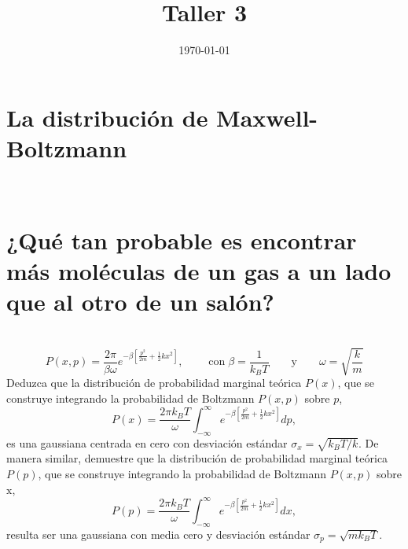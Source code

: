 \documentclass[a4paper]{article}
\date{\today}
\title{Taller 3}
\begin{document}
    \header{}

    \section{La distribución de Maxwell-Boltzmann}
    \\
    
    
    
    
    
    
    
    
    
    
    \section{ ¿Qué tan probable es encontrar más moléculas de un gas a 
    un lado que al otro de un salón?}
    
    
    
    
    
    
    
    
    
    \\
    
    
    
    
    
    
    
    
    
    
    
    
    



    
    $$
    P(x, p)=\frac{2 \pi}{\beta \omega} e^{-\beta\left[\frac{p^2}{2 m}+\frac{1}{2} k x^2\right]},\qquad  \operatorname{con} \beta=\frac{1}{k_B T} \qquad \mathrm{y} \qquad \omega=\sqrt{\frac{k}{m}}
    $$
    Deduzca que la distribución de probabilidad marginal teórica $P(x)$, que se construye integrando la probabilidad de Boltzmann $P(x, p)$ sobre $p$,
    $$
    P(x)=\frac{2 \pi k_B T}{\omega} \int_{-\infty}^{\infty} e^{-\beta\left[\frac{p^2}{2 m}+\frac{1}{2} k x^2\right]} d p,
    $$
    es una gaussiana centrada en cero con desviación estándar $\sigma_x=\sqrt{k_B T / k}$. De manera similar, demuestre que la distribución de probabilidad marginal teórica $P(p)$, que se construye integrando la probabilidad de Boltzmann $P(x, p)$ sobre $\mathrm{x}$,
    $$
    P(p)=\frac{2 \pi k_B T}{\omega} \int_{-\infty}^{\infty} e^{-\beta\left[\frac{p^2}{2 m}+\frac{1}{2} k x^2\right]} d x,
    $$
    resulta ser una gaussiana con media cero y desviación estándar $\sigma_p=\sqrt{m k_B T}$.
\end{document}
